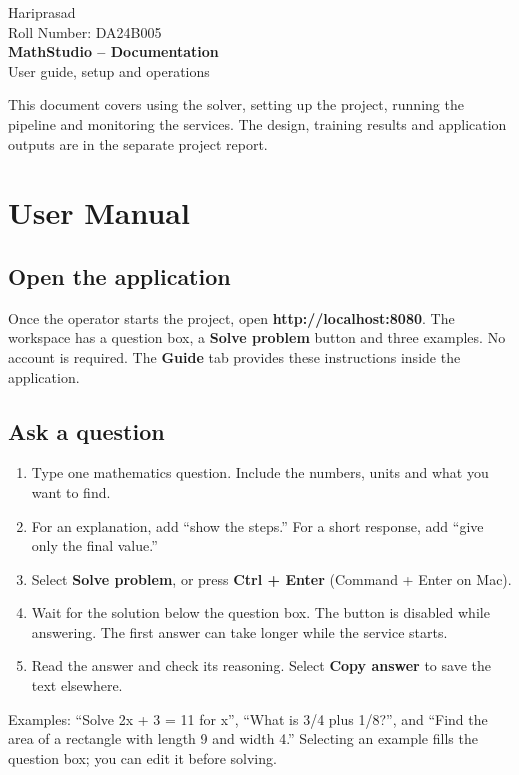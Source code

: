 \documentclass[11pt,a4paper]{article}
\date{}
\begin{document}
\begin{titlepage}\centering
{\large Hariprasad}\\[4pt]
{\large Roll Number: DA24B005}\\[25pt]
{\LARGE\bfseries MathStudio -- Documentation}\\[14pt]
{\large User guide, setup and operations}\\[30pt]
\begin{minipage}{0.85\textwidth}
This document covers using the solver, setting up the project, running the pipeline and monitoring the services. The design, training results and application outputs are in the separate project report.
\end{minipage}
\end{titlepage}
\setcounter{page}{2}
\section*{User Manual}
\subsection*{Open the application}
Once the operator starts the project, open \textbf{http://localhost:8080}. The workspace has a question box, a \textbf{Solve problem} button and three examples. No account is required. The \textbf{Guide} tab provides these instructions inside the application.

\subsection*{Ask a question}
\begin{enumerate}
\item Type one mathematics question. Include the numbers, units and what you want to find.
\item For an explanation, add “show the steps.” For a short response, add “give only the final value.”
\item Select \textbf{Solve problem}, or press \textbf{Ctrl + Enter} (Command + Enter on Mac).
\item Wait for the solution below the question box. The button is disabled while answering. The first answer can take longer while the service starts.
\item Read the answer and check its reasoning. Select \textbf{Copy answer} to save the text elsewhere.
\end{enumerate}
Examples: “Solve 2x + 3 = 11 for x”, “What is 3/4 plus 1/8?”, and “Find the area of a rectangle with length 9 and width 4.” Selecting an example fills the question box; you can edit it before solving.
\end{document}
